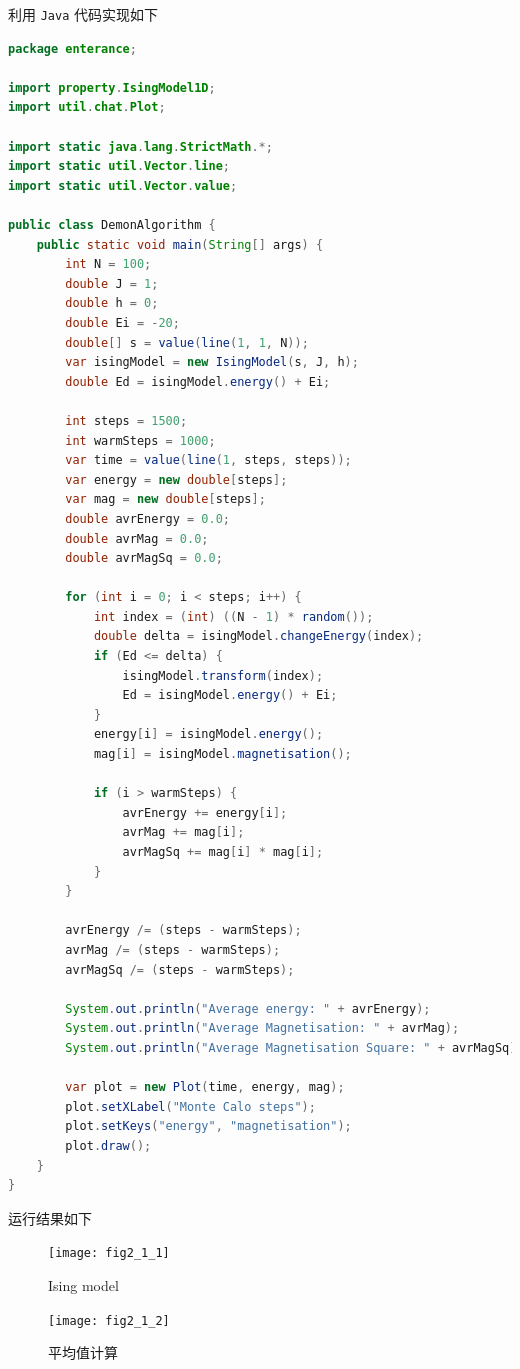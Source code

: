 \documentclass[UTF8]{ctexart}
\begin{document}
    利用 \texttt{Java} 代码实现如下
    \begin{lstlisting}[language=Java, breaklines = true,label={lst:2.1.2}]
package enterance;

import property.IsingModel1D;
import util.chat.Plot;

import static java.lang.StrictMath.*;
import static util.Vector.line;
import static util.Vector.value;

public class DemonAlgorithm {
    public static void main(String[] args) {
        int N = 100;
        double J = 1;
        double h = 0;
        double Ei = -20;
        double[] s = value(line(1, 1, N));
        var isingModel = new IsingModel(s, J, h);
        double Ed = isingModel.energy() + Ei;

        int steps = 1500;
        int warmSteps = 1000;
        var time = value(line(1, steps, steps));
        var energy = new double[steps];
        var mag = new double[steps];
        double avrEnergy = 0.0;
        double avrMag = 0.0;
        double avrMagSq = 0.0;

        for (int i = 0; i < steps; i++) {
            int index = (int) ((N - 1) * random());
            double delta = isingModel.changeEnergy(index);
            if (Ed <= delta) {
                isingModel.transform(index);
                Ed = isingModel.energy() + Ei;
            }
            energy[i] = isingModel.energy();
            mag[i] = isingModel.magnetisation();

            if (i > warmSteps) {
                avrEnergy += energy[i];
                avrMag += mag[i];
                avrMagSq += mag[i] * mag[i];
            }
        }

        avrEnergy /= (steps - warmSteps);
        avrMag /= (steps - warmSteps);
        avrMagSq /= (steps - warmSteps);

        System.out.println("Average energy: " + avrEnergy);
        System.out.println("Average Magnetisation: " + avrMag);
        System.out.println("Average Magnetisation Square: " + avrMagSq);

        var plot = new Plot(time, energy, mag);
        plot.setXLabel("Monte Calo steps");
        plot.setKeys("energy", "magnetisation");
        plot.draw();
    }
}
    \end{lstlisting}

    运行结果如下
    \begin{figure}[h]
        \centering
        \texttt{[image: fig2\_1\_1]}
        \caption{Ising model}\label{fig:2.1.1}
    \end{figure}
    \begin{figure}[h]
        \centering
        \texttt{[image: fig2\_1\_2]}
        \caption{平均值计算}\label{fig:2.1.2}
    \end{figure}
\end{document}
